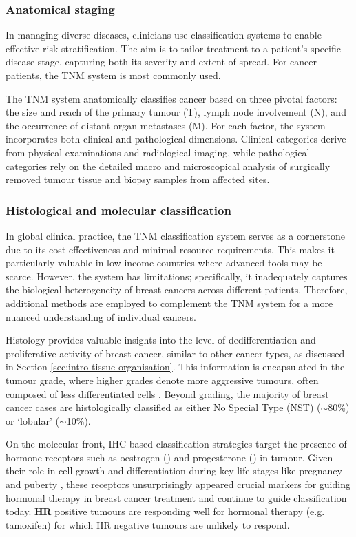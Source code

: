 \subsubsection{Anatomical staging}

In managing diverse diseases, clinicians use classification systems to enable effective risk stratification. The aim is to tailor treatment to a patient's specific disease stage, capturing both its severity and extent of spread. For cancer patients, the TNM system is most commonly used.

The TNM system anatomically classifies cancer based on three pivotal factors: the size and reach of the primary tumour (T), lymph node involvement (N), and the occurrence of distant organ metastases (M). For each factor, the system incorporates both clinical and pathological dimensions. Clinical categories derive from physical examinations and radiological imaging, while pathological categories rely on the detailed macro and microscopical analysis of surgically removed tumour tissue and biopsy samples from affected sites.

\subsubsection{Histological and molecular classification}

In global clinical practice, the TNM classification system serves as a cornerstone due to its cost-effectiveness and minimal resource requirements. This makes it particularly valuable in low-income countries where advanced tools may be scarce. However, the system has limitations; specifically, it inadequately captures the biological heterogeneity of breast cancers across different patients. Therefore, additional methods are employed to complement the TNM system for a more nuanced understanding of individual cancers.

Histology provides valuable insights into the level of dedifferentiation and proliferative activity of breast cancer, similar to other cancer types, as discussed in Section \cref{sec:intro-tissue-organisation}. This information is encapsulated in the tumour grade, where higher grades denote more aggressive tumours, often composed of less differentiated cells \parencite{Greenough1925-wg, Elston1991-md}. Beyond grading, the majority of breast cancer cases are histologically classified as either No Special Type (NST) ($\sim$80\%) or `lobular' ($\sim$10\%).

On the molecular front, \ac{IHC} based classification strategies target the presence of hormone receptors such as oestrogen () and progesterone () in tumour. Given their role in cell growth and differentiation during key life stages like pregnancy and puberty , these receptors unsurprisingly appeared crucial markers for guiding hormonal therapy in breast cancer treatment and continue to guide classification today. \textbf{\ac{HR}} positive tumours are responding well for hormonal therapy (e.g. tamoxifen) for which HR negative tumours are unlikely to respond.

